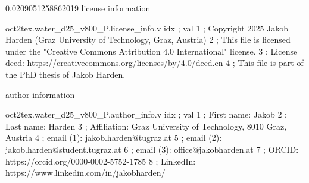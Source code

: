 \expandafter\def\csname oct2tex.water_d25_v800_P.dtabmax.v\endcsname{0.0209051258862019}
\expandafter\def\csname oct2tex.water_d25_v800_P.license_info.d\endcsname{license information}
\begin{filecontents}[overwrite]{oct2tex.water_d25_v800_P.license_info.v}
idx ; val
1 ; Copyright 2025 Jakob Harden (Graz University of Technology, Graz, Austria)
2 ; This file is licensed under the "Creative Commons Attribution 4.0 International" license.
3 ; License deed: https://creativecommons.org/licenses/by/4.0/deed.en
4 ; This file is part of the PhD thesis of Jakob Harden.
\end{filecontents}
\expandafter\def\csname oct2tex.water_d25_v800_P.author_info.d\endcsname{author information}
\begin{filecontents}[overwrite]{oct2tex.water_d25_v800_P.author_info.v}
idx ; val
1 ; First name: Jakob
2 ; Last name: Harden
3 ; Affiliation: Graz University of Technology, 8010 Graz, Austria
4 ; email (1): jakob.harden@tugraz.at
5 ; email (2): jakob.harden@student.tugraz.at
6 ; email (3): office@jakobharden.at
7 ; ORCID: https://orcid.org/0000-0002-5752-1785
8 ; LinkedIn: https://www.linkedin.com/in/jakobharden/
\end{filecontents}
